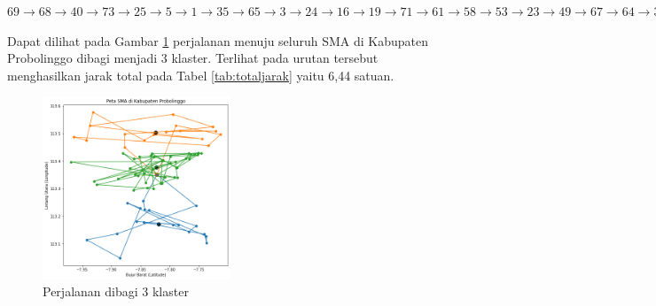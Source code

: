 \noindent $
69 \rightarrow 68 \rightarrow 40 \rightarrow 73 \rightarrow 25 \rightarrow 5 \rightarrow 1 \rightarrow 35 \rightarrow 65 \rightarrow 3 \rightarrow 24 \rightarrow 16 \rightarrow 19 \rightarrow 71 \rightarrow 61 \rightarrow 58 \rightarrow 53 \rightarrow 23 \rightarrow 49 \rightarrow 67 \rightarrow 64 \rightarrow 33 \rightarrow 4 \rightarrow 18 \rightarrow 39 \rightarrow 48 \rightarrow 20 \rightarrow 75 \rightarrow 63 \rightarrow 15 \rightarrow 31 \rightarrow 43 \rightarrow 57 \rightarrow 9 \rightarrow 6 \rightarrow 12 \rightarrow 46 \rightarrow 45 \rightarrow 52 \rightarrow 62
$
\vspace{0.4cm}

Dapat dilihat pada Gambar \ref{fig:hasil_mtsp3} perjalanan menuju seluruh SMA di Kabupaten Probolinggo dibagi menjadi 3 klaster. Terlihat pada urutan tersebut menghasilkan jarak total pada Tabel \ref{tab:totaljarak} yaitu 6,44 satuan.

\begin{figure}[H]
\centering
\includegraphics[width=0.5\textwidth]{Gambar/hasil_mtsp/3}
\caption{Perjalanan dibagi 3 klaster}
\label{fig:hasil_mtsp3}
\end{figure}

